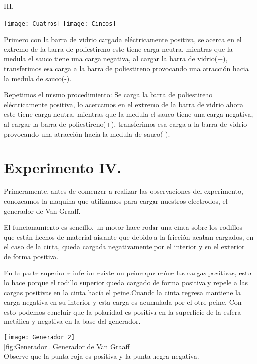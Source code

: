 \documentclass[10pt]{article}
\begin{document}
\begin{multicols}{2}
	III.

	\begin{center}
		\texttt{[image: Cuatros]}
		\hspace{0.3\textwidth}
		\texttt{[image: Cincos]}
	\end{center}


	Primero con la barra de vidrio cargada eléctricamente positiva, se acerca en el extremo de la barra de poliestireno este tiene carga neutra, mientras que la medula el sauco tiene una carga negativa, al cargar la barra de vidrio(+), transferimos esa carga a la barra de poliestireno provocando una atracción hacia la medula de sauco(-).

	Repetimos el mismo procedimiento:
	Se carga la barra de poliestireno eléctricamente positiva, lo acercamos en el extremo de la barra de vidrio ahora este tiene carga neutra, mientras que la medula el sauco tiene una carga negativa, al cargar la barra de poliestireno(+), transferimos esa carga a la barra de vidrio provocando una atracción hacia la medula de sauco(-).
	\section{Experimento IV.}

	Primeramente, antes de comenzar a realizar las observaciones del experimento, conozcamos la maquina que utilizamos para cargar nuestros electrodos, el generador de Van Graaff.

	El funcionamiento es sencillo, un motor hace rodar una cinta sobre los rodillos que están hechos de material aislante que debido a la fricción acaban cargados, en el caso de la cinta, queda cargada negativamente por el interior y en el exterior de forma positiva.

	En la parte superior e inferior existe un peine que reúne las cargas positivas, esto lo hace porque el rodillo superior queda cargado de forma positiva y repele a las cargas positivas en la cinta hacía el peine.Cuando la cinta regresa mantiene la carga negativa en su interior y esta carga es acumulada por el otro peine. Con esto podemos concluir que la polaridad es positiva en la superficie de la esfera metálica y negativa en la base del generador.

	\begin{center}
		\texttt{[image: Generador 2]}\\

		\ref{fig:Generador}. Generador de Van Graaff\\
		\label{fig:Generador}
		Observe que la punta roja es positiva y la punta negra negativa.
	\end{center}


\end{multicols}
\end{document}
